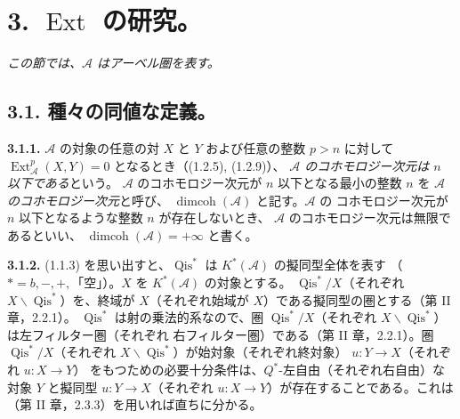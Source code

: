 \clearpage
{}%
\begingroup\small\setlength{\parskip}{0pt}\setlength{\emergencystretch}{1.5em}
\setlength{\abovedisplayskip}{4pt plus 2pt minus 2pt}%
\setlength{\belowdisplayskip}{4pt plus 2pt minus 2pt}%

\section*{3. \texorpdfstring{$\operatorname{Ext}$}{Ext} の研究。}

\noindent\textit{この節では、$\mathcal A$ はアーベル圏を表す。}

\subsection*{3.1. 種々の同値な定義。}

\noindent\textbf{3.1.1.}\quad
$\mathcal A$ の対象の任意の対 $X$ と $Y$ および任意の整数 $p>n$ に対して
$\operatorname{Ext}_{\mathcal A}^{p}(X,Y)=0$ となるとき（(1.2.5), (1.2.9)）、
\emph{$\mathcal A$ のコホモロジー次元は $n$ 以下である}という。
$\mathcal A$ のコホモロジー次元が $n$ 以下となる最小の整数 $n$ を
\emph{$\mathcal A$ のコホモロジー次元}と呼び、
$\operatorname{dimcoh}(\mathcal A)$ と記す。$\mathcal A$ の
コホモロジー次元が $n$ 以下となるような整数 $n$ が存在しないとき、
$\mathcal A$ のコホモロジー次元は無限であるといい、
$\operatorname{dimcoh}(\mathcal A)=+\infty$ と書く。

\noindent\textbf{3.1.2.}\quad
(1.1.3) を思い出すと、$\operatorname{Qis}^{*}$ は
$K^{*}(\mathcal A)$ の擬同型全体を表す
（$*=b,-,+,{}$「空」）。$X$ を $K^{*}(\mathcal A)$ の対象とする。
$\operatorname{Qis}^{*}/X$（それぞれ
$X\backslash\operatorname{Qis}^{*}$）を、終域が $X$（それぞれ始域が
$X$）である擬同型の圏とする（第 II 章，2.2.1）。
$\operatorname{Qis}^{*}$ は射の乗法的系なので、圏
$\operatorname{Qis}^{*}/X$（それぞれ
$X\backslash\operatorname{Qis}^{*}$）は左フィルター圏（それぞれ
右フィルター圏）である（第 II 章，2.2.1）。圏
$\operatorname{Qis}^{*}/X$（それぞれ
$X\backslash\operatorname{Qis}^{*}$）が始対象（それぞれ終対象）
$u\colon Y\longrightarrow X$（それぞれ $u\colon X\longrightarrow Y$）
をもつための必要十分条件は、$Q^{*}$-左自由（それぞれ右自由）な対象
$Y$ と擬同型 $u\colon Y\longrightarrow X$（それぞれ
$u\colon X\longrightarrow Y$）が存在することである。これは
（第 II 章，2.3.3）を用いれば直ちに分かる。

